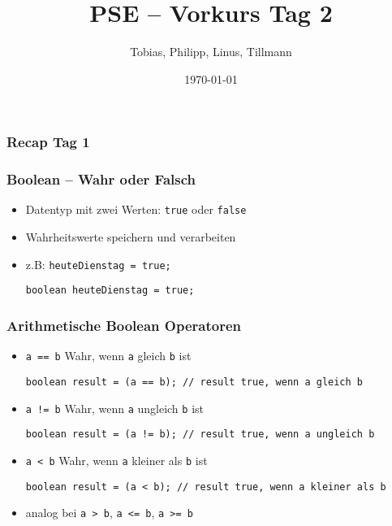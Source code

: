 \documentclass{../../presentation}
\title{PSE – Vorkurs Tag 2}
\author{Tobias, Philipp, Linus, Tillmann}
\institute{FIUS - Fachgruppe Informatik Universität Stuttgart}
\date{\today}
\begin{document}
\begin{frame}
  \titlepage
\end{frame}

\begin{frame}
  \listoftodos
\end{frame}

\begin{frame}
  \frametitle{Recap Tag 1}
\end{frame}



\begin{frame}[fragile]
  \frametitle{Boolean – Wahr oder Falsch}
  \begin{itemize}
    \item Datentyp mit zwei Werten: \texttt{true} oder \texttt{false}
    \item Wahrheitswerte speichern und verarbeiten

    \item z.B: \texttt{heuteDienstag = true;}
          \begin{verbatim}
boolean heuteDienstag = true;
    \end{verbatim}

  \end{itemize}
\end{frame}



\begin{frame}[fragile]
  \frametitle{Arithmetische Boolean Operatoren}


  \begin{itemize}
    \item<1->\texttt{a == b} \quad Wahr, wenn \texttt{a} gleich \texttt{b} ist
          \begin{verbatim}
boolean result = (a == b); // result true, wenn a gleich b
    \end{verbatim}

    \item<2->\texttt{a != b} \quad Wahr, wenn \texttt{a} ungleich \texttt{b} ist
          \begin{verbatim}
boolean result = (a != b); // result true, wenn a ungleich b
    \end{verbatim}

    \item<3->\texttt{a < b} \quad Wahr, wenn \texttt{a} kleiner als \texttt{b} ist
          \begin{verbatim}
boolean result = (a < b); // result true, wenn a kleiner als b
    \end{verbatim}

    \item<4->analog bei \texttt{a > b}, \texttt{a <= b}, \texttt{a >= b} \quad
  \end{itemize}
\end{frame}
\end{document}
